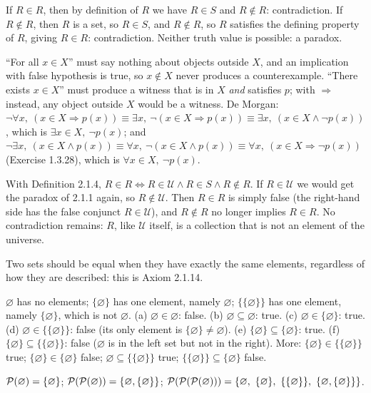 If $R\in R$, then by definition of $R$ we have $R\in S$ and $R\notin R$: contradiction. If $R\notin R$, then $R$ is a set, so $R\in S$, and $R\notin R$, so $R$ satisfies the defining property of $R$, giving $R\in R$: contradiction. Neither truth value is possible: a paradox.

 ``For all $x\in X$'' must say nothing about objects outside $X$, and an implication with false hypothesis is true, so $x\notin X$ never produces a counterexample. ``There exists $x\in X$'' must produce a witness that is in $X$ \emph{and} satisfies $p$; with $\Rightarrow$ instead, any object outside $X$ would be a witness. De Morgan: $\neg\forall x,\ (x\in X\Rightarrow p(x))\equiv\exists x,\ \neg(x\in X\Rightarrow p(x))\equiv\exists x,\ (x\in X\wedge\neg p(x))$, which is $\exists x\in X,\ \neg p(x)$; and $\neg\exists x,\ (x\in X\wedge p(x))\equiv\forall x,\ \neg(x\in X\wedge p(x))\equiv\forall x,\ (x\in X\Rightarrow\neg p(x))$ (Exercise 1.3.28), which is $\forall x\in X,\ \neg p(x)$.

 With Definition 2.1.4, $R\in R\Leftrightarrow R\in\mathcal U\wedge R\in S\wedge R\notin R$. If $R\in\mathcal U$ we would get the paradox of 2.1.1 again, so $R\notin\mathcal U$. Then $R\in R$ is simply false (the right-hand side has the false conjunct $R\in\mathcal U$), and $R\notin R$ no longer implies $R\in R$. No contradiction remains: $R$, like $\mathcal U$ itself, is a collection that is not an element of the universe.

 Two sets should be equal when they have exactly the same elements, regardless of how they are described: this is Axiom 2.1.14.

 $\varnothing$ has no elements; $\{\varnothing\}$ has one element, namely $\varnothing$; $\{\{\varnothing\}\}$ has one element, namely $\{\varnothing\}$, which is not $\varnothing$. (a) $\varnothing\in\varnothing$: false. (b) $\varnothing\subseteq\varnothing$: true. (c) $\varnothing\in\{\varnothing\}$: true. (d) $\varnothing\in\{\{\varnothing\}\}$: false (its only element is $\{\varnothing\}\ne\varnothing$). (e) $\{\varnothing\}\subseteq\{\varnothing\}$: true. (f) $\{\varnothing\}\subseteq\{\{\varnothing\}\}$: false ($\varnothing$ is in the left set but not in the right). More: $\{\varnothing\}\in\{\{\varnothing\}\}$ true; $\{\varnothing\}\in\{\varnothing\}$ false; $\varnothing\subseteq\{\{\varnothing\}\}$ true; $\{\{\varnothing\}\}\subseteq\{\varnothing\}$ false.

 $\mathcal{P}(\varnothing)=\{\varnothing\}$; $\mathcal{P}(\mathcal{P}(\varnothing))=\{\varnothing,\{\varnothing\}\}$; $\PS(\PS(\PS(\varnothing)))=\{\varnothing,\ \{\varnothing\},\ \{\{\varnothing\}\},\ \{\varnothing,\{\varnothing\}\}\}$.

